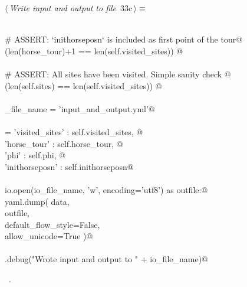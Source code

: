 \documentclass[11.5pt]{report}
\begin{document}
\begin{flushleft} \small\label{scrap27}\raggedright\small
{} $\langle\,${\itshape Write input and output to file}\nobreak\ {\footnotesize {33c}}$\,\rangle\equiv$
\vspace{-1ex}
\begin{list}{}{} \item
\mbox{}\verb@@\\
\mbox{}\verb@# ASSERT: `inithorseposn` is included as first point of the tour@\\
\mbox{}\verb@assert(len(horse_tour)+1 == len(self.visited_sites)) @\\
\mbox{}\verb@@\\
\mbox{}\verb@# ASSERT: All sites have been visited. Simple sanity check @\\
\mbox{}\verb@assert(len(self.sites)   == len(self.visited_sites)) @\\
\mbox{}\verb@@\\
\mbox{}\verb@io_file_name = 'input_and_output.yml'@\\
\mbox{}\verb@@\\
\mbox{}\verb@data = {'visited_sites'  : self.visited_sites, @\\
\mbox{}\verb@        'horse_tour'     : self.horse_tour, @\\
\mbox{}\verb@        'phi'            : self.phi, @\\
\mbox{}\verb@        'inithorseposn'  : self.inithorseposn}@\\
\mbox{}\verb@@\\
\mbox{}\verb@with io.open(io_file_name, 'w', encoding='utf8') as outfile:@\\
\mbox{}\verb@     yaml.dump( data, \@\\
\mbox{}\verb@                outfile, \@\\
\mbox{}\verb@                default_flow_style=False, \@\\
\mbox{}\verb@                allow_unicode=True )@\\
\mbox{}\verb@@\\
\mbox{}\verb@logger.debug("Wrote input and output to " + io_file_name)@\\
\mbox{}\verb@@{\NWsep}
\end{list}
\vspace{-1.5ex}
\footnotesize
\begin{list}{}{\setlength{\itemsep}{-\parsep}\setlength{\itemindent}{-\leftmargin}}
\item \NWtxtMacroRefIn\ .

\item{}
\end{list}
\vspace{4ex}
\end{flushleft}
\newchunk 
\end{document}
